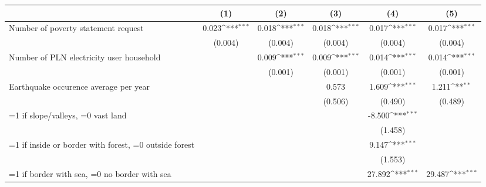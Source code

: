 {
\def\sym#1{\ifmmode^{#1}\else\(^{#1}\)\fi}
\begin{tabular}{l*{5}{c}}
\toprule
                    &\multicolumn{1}{c}{(1)}         &\multicolumn{1}{c}{(2)}         &\multicolumn{1}{c}{(3)}         &\multicolumn{1}{c}{(4)}         &\multicolumn{1}{c}{(5)}         \\
\midrule
\hspace{0.25cm} Number of poverty statement request&       0.023\sym{***}&       0.018\sym{***}&       0.018\sym{***}&       0.017\sym{***}&       0.017\sym{***}\\
                    &     (0.004)         &     (0.004)         &     (0.004)         &     (0.004)         &     (0.004)         \\
\addlinespace
\hspace{0.25cm} Number of PLN electricity user household&                     &       0.009\sym{***}&       0.009\sym{***}&       0.014\sym{***}&       0.014\sym{***}\\
                    &                     &     (0.001)         &     (0.001)         &     (0.001)         &     (0.001)         \\
\addlinespace
\hspace{0.25cm} Earthquake occurence average per year&                     &                     &       0.573         &       1.609\sym{***}&       1.211\sym{**} \\
                    &                     &                     &     (0.506)         &     (0.490)         &     (0.489)         \\
\addlinespace
\hspace{0.25cm} =1 if slope/valleys, =0 vast land&                     &                     &                     &      -8.500\sym{***}&                     \\
                    &                     &                     &                     &     (1.458)         &                     \\
\addlinespace
\hspace{0.25cm} =1 if inside or border with forest, =0 outside forest&                     &                     &                     &       9.147\sym{***}&                     \\
                    &                     &                     &                     &     (1.553)         &                     \\
\addlinespace
\hspace{0.25cm} =1 if border with sea, =0 no border with sea&                     &                     &                     &      27.892\sym{***}&      29.487\sym{***}\\

\end{tabular}}
